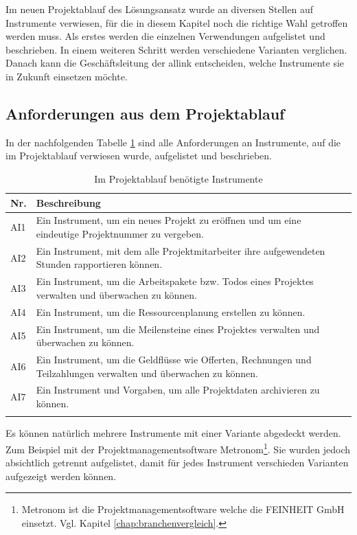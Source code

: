 Im neuen Projektablauf des Lösungsansatz wurde an diversen Stellen auf Instrumente
verwiesen, für die in diesem Kapitel noch die richtige Wahl getroffen werden
muss. Als erstes werden die einzelnen Verwendungen aufgelistet und beschrieben.
In einem weiteren Schritt werden verschiedene Varianten verglichen. Danach
kann die Geschäftsleitung der allink entscheiden, welche Instrumente sie
in Zukunft einsetzen möchte.

\subsection{Anforderungen aus dem Projektablauf}
In der nachfolgenden Tabelle \ref{tab:projektablauf_instrumente} sind alle
Anforderungen an Instrumente, auf die im Projektablauf verwiesen wurde, aufgelistet 
und beschrieben.

\begin{longtable}{lp{14cm}}
    \toprule \textbf{Nr.} & \textbf{Beschreibung} \\
    \midrule AI1 & Ein Instrument, um ein neues Projekt zu eröffnen und um eine 
        eindeutige Projektnummer zu vergeben. \\
    \midrule AI2 & Ein Instrument, mit dem alle Projektmitarbeiter ihre 
        aufgewendeten Stunden rapportieren können. \\
    \midrule AI3 & Ein Instrument, um die Arbeitspakete bzw. Todos eines Projektes
        verwalten und überwachen zu können. \\
    \midrule AI4 & Ein Instrument, um die Ressourcenplanung erstellen zu können. \\
    \midrule AI5 & Ein Instrument, um die Meilensteine eines Projektes verwalten 
        und überwachen zu können.\\
    \midrule AI6 & Ein Instrument, um die Geldflüsse wie Offerten, Rechnungen 
        und Teilzahlungen verwalten und überwachen zu können. \\
    \midrule AI7 & Ein Instrument und Vorgaben, um alle Projektdaten archivieren 
        zu können. \\
    \bottomrule
    \caption[Im Projektablauf benötigte Instrumente]{Im Projektablauf benötigte 
        Instrumente\footnotemark}
    \label{tab:projektablauf_instrumente}
\end{longtable}

Es können natürlich mehrere Instrumente mit einer Variante abgedeckt werden.
Zum Beispiel mit der Projektmanagementsoftware Metronom\footnote{Metronom ist die 
Projektmanagementsoftware welche die FEINHEIT GmbH einsetzt.
Vgl. Kapitel \ref{chap:branchenvergleich}.}. Sie wurden jedoch absichtlich getrennt 
aufgelistet, damit für jedes Instrument verschieden Varianten aufgezeigt werden können.

